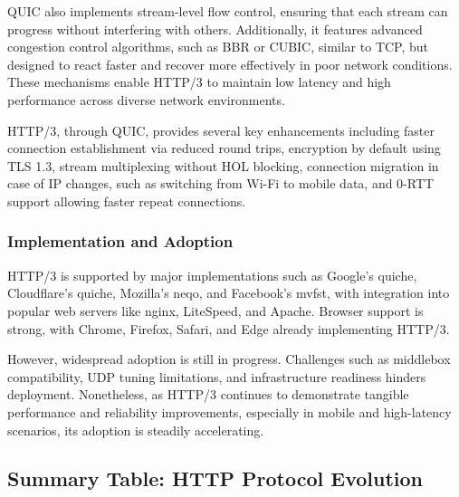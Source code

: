 QUIC also implements stream-level flow control, ensuring that each stream can progress without interfering with others. Additionally, it features advanced congestion control algorithms, such as BBR or CUBIC, similar to TCP, but designed to react faster and recover more effectively in poor network conditions. These mechanisms enable HTTP/3 to maintain low latency and high performance across diverse network environments.

HTTP/3, through QUIC, provides several key enhancements including faster connection establishment via reduced round trips, encryption by default using TLS 1.3, stream multiplexing without HOL blocking, connection migration in case of IP changes, such as switching from Wi-Fi to mobile data, and 0-RTT support allowing faster repeat connections.


\subsubsection{Implementation and Adoption}

HTTP/3 is supported by major implementations such as Google’s quiche, Cloudflare’s quiche, Mozilla’s neqo, and Facebook’s mvfst, with integration into popular web servers like nginx, LiteSpeed, and Apache. Browser support is strong, with Chrome, Firefox, Safari, and Edge already implementing HTTP/3.

However, widespread adoption is still in progress. Challenges such as middlebox compatibility, UDP tuning limitations, and infrastructure readiness hinders deployment. Nonetheless, as HTTP/3 continues to demonstrate tangible performance and reliability improvements, especially in mobile and high-latency scenarios, its adoption is steadily accelerating.


\subsection{Summary Table: HTTP Protocol Evolution}

\begin{table}[H]
\centering
{}
\caption{Evolution of HTTP protocol features across versions}
\end{table}


